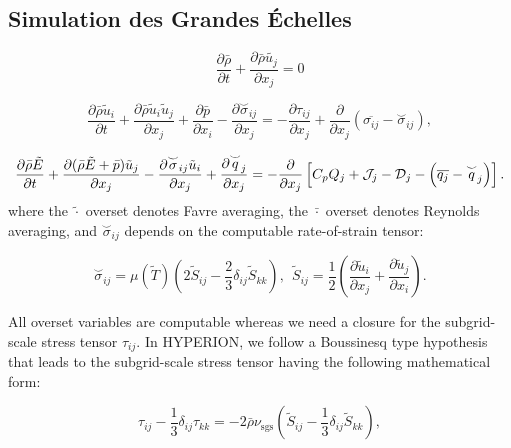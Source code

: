 
\subsection{Simulation des Grandes Échelles}

$$
\frac{\partial\bar{\rho}}{\partial t}+\frac{\partial\bar{\rho}\tilde{u_j}}{\partial x_j}=0
$$

\begin{equation}
    \dfrac{\partial \bar\rho \tilde{u}_i}{\partial t} + \dfrac{\partial \bar\rho \tilde{u}_i\tilde{u}_j}{\partial x_j} + \dfrac{\partial \bar p}{\partial x_i} - \dfrac{\partial \overset{\smile}{\sigma}_{ij}}{\partial x_j} = -\dfrac{\partial \tau_{ij}}{\partial x_j} + \dfrac{\partial}{\partial x_j} \left( \overline{\sigma_{ij}} - \overset{\smile}{\sigma}_{ij}\right),
    \label{eq:les_momentum_eqns}
\end{equation}

$$
 \frac{\partial \bar{\rho} \tilde{E}}{\partial t}+\frac{\partial(\bar{\rho} \tilde{E}+\bar{p}) \tilde{u}_j}{\partial x_j}-\frac{\partial \overset{\smile}{\sigma}_{i j} \tilde{u}_i}{\partial x_j}+\frac{\partial \overset{\smile}{q}_j}{\partial x_j} \\
 =-\frac{\partial}{\partial x_j}\left[C_p Q_j+\mathcal{J}_j-\mathcal{D}_j-\left(\overline{q_j}-\overset{\smile}{q}_j\right)\right] .
$$
where the $\tilde{\cdot}$ overset denotes Favre averaging, the $\bar\cdot$ overset denotes Reynolds averaging, and $\overset{\smile}{\sigma}_{ij}$ depends on the computable rate-of-strain tensor:

\begin{equation}
    \overset{\smile}{\sigma}_{ij} = \mu(\tilde{T}) \left( 2 \tilde{S}_{ij} - \dfrac{2}{3}\delta_{ij}\tilde{S}_{kk} \right),~~ \tilde{S}_{ij} = \dfrac{1}{2}\left( \dfrac{\partial\tilde{u}_i}{\partial x_j} + \dfrac{\partial \tilde{u}_j}{\partial x_i}\right).
    \label{eq:sigma_smile}
\end{equation}

All overset variables are computable whereas we need a closure for the subgrid-scale stress tensor $\tau_{ij}$.
In HYPERION, we follow a Boussinesq type hypothesis \cite{boussinesq1877essai} that leads to the subgrid-scale stress tensor having the following mathematical form:

\begin{equation}
    \tau_{ij} - \dfrac{1}{3}\delta_{ij}\tau_{kk} = - 2 \bar\rho \nu_{\text{sgs}} \left( \tilde{S}_{ij} - \dfrac{1}{3} \delta_{ij}\tilde{S}_{kk} \right),
    \label{eq:boussinesq_les}
\end{equation}

